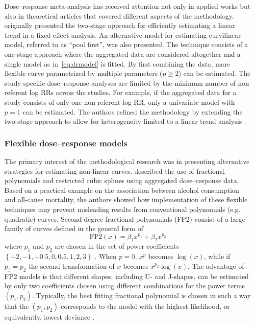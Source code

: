 \documentclass[11pt,a4paper,twoside,openany]{book}\usepackage{knitr}
\begin{document}
{{Dose--response meta-analysis has received attention not only in applied works but also in theoretical articles that covered different aspects of the methodology. 
\noindent \cite{greenland1992methods} originally presented the two-stage approach for efficiently estimating a linear trend in a fixed-effect analysis. An alternative model for estimating curvilinear model, referred to as ``pool first'', was also presented. The technique consists of a one-stage approach where the aggregated data are considered altogether and a single model as in~\ref{eq:drmodel} is fitted. By first combining the data, more flexible curve parametrized by multiple parameters ($p \ge 2$) can be estimated. The study-specific dose--response analyses are limited by the minimum number of non-referent log RRs across the studies. For example, if the aggregated data for a study consists of only one non referent log RR, only a univariate model with $p = 1$ can be estimated. The authors refined the methodology by extending the two-stage approach to allow for heterogeneity limited to a linear trend analysis \citep{berlin1993meta}. 

\subsubsection*{Flexible dose--response models}

The primary interest of the methodological research was in presenting alternative strategies for estimating non-linear curves. \cite{bagnardi2004flexible} described the use of fractional polynomials and restricted cubic splines using aggregated dose--response data. Based on a practical example on the association between alcohol consumption and all-cause mortality, the authors showed how implementation of these flexible techniques may prevent misleading results from conventional polynomials (e.g. quadratic) curves. 
Second-degree fractional polynomials (FP2) consist of a large family of curves defined in the general form of
\begin{equation}
\mathrm{FP2}(x) = \beta_1 x^{p_1} + \beta_2x^{p_2}
\label{eq:fracpol}
\end{equation}
\noindent where $p_1$ and $p_2$ are chosen in the set of power coefficients $\left\{-2, -1, -0.5, 0, 0.5, 1, 2, 3 \right\}$ \citep{royston1994regression, royston2000strategy}. When $p = 0$, $x^p$ becomes $\log(x)$, while if $p_1 = p_2$ the second transformation of $x$ becomes $x^{p_2}\log(x)$. The advantage of FP2 models is that different shapes, including U- and J-shapes, can be estimated by only two coefficients chosen using different combinations for the power terms $(p_1, p_2)$. Typically, the best fitting fractional polynomial is chosen in such a way that the $(p_1, p_2)$ corresponds to the model with the highest likelihood, or equivalently, lowest deviance \citep{royston2001flexible}. 

}}
\end{document}
